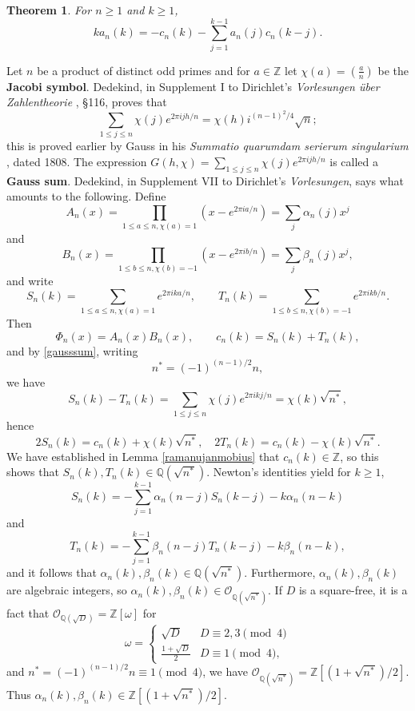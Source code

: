 \documentclass{article}
\newtheorem{theorem}{Theorem}
\theoremstyle{definition}
\begin{document}
\begin{theorem}
For $n \geq 1$ and $k \geq 1$,
\[
ka_n(k) = -c_n(k) - \sum_{j=1}^{k-1} a_n(j) c_n(k-j).
\]
\end{theorem}





Let $n$ be a product of distinct odd primes and for $a \in \mathbb{Z}$ let $\chi(a) = \left( \frac{a}{n}\right)$ be the \textbf{Jacobi symbol}. 
Dedekind, in Supplement I to Dirichlet's {\em Vorlesungen \"uber Zahlentheorie}  \cite[pp.~208--210]{dirichlet}, \S 116, proves that
\begin{equation}
\sum_{1 \leq j \leq n} \chi(j) e^{2\pi ij h/n} = \chi(h) i^{(n-1)^2/4} \sqrt{n};
\label{gausssum}
\end{equation}
this is proved earlier by 
Gauss in his {\em Summatio quarumdam serierum singularium} \cite[pp.~9--45]{gaussII}, dated 1808.
The expression $G(h,\chi)=\sum_{1 \leq j \leq n} \chi(j) e^{2\pi ij h/n}$ is called a \textbf{Gauss sum}.
Dedekind, in Supplement VII to Dirichlet's {\em Vorlesungen}, says what amounts to
the following.
Define
\[
A_n(x) = \prod_{1 \leq a \leq n, \chi(a)=1} (x-e^{2\pi ia/n}) = \sum_j \alpha_n(j) x^j
\] 
and
\[
B_n(x) = \prod_{1 \leq b \leq n, \chi(b)=-1} (x-e^{2\pi ib/n}) = \sum_j \beta_n(j) x^j,
\]
and write
\[
S_n(k) =  \sum_{1 \leq a \leq n, \chi(a)=1} e^{2\pi ik a/n},
\qquad T_n(k) = \sum_{1 \leq b \leq n, \chi(b)=-1} e^{2\pi ik b/n}.
\]
Then
\[
\Phi_n(x) = A_n(x) B_n(x),\qquad c_n(k) = S_n(k) + T_n(k),
\]
and by \eqref{gausssum}, writing
\[
n^*=(-1)^{(n-1)/2} n,
\]
we have
\[
S_n(k) - T_n(k) =\sum_{1 \leq j \leq n} \chi(j) e^{2\pi ik j/n} = \chi(k)  \sqrt{n^*},
\]
hence
\[
2S_n(k) = c_n(k) +  \chi(k)   \sqrt{n^*},
\quad
2T_n(k) = c_n(k) -  \chi(k)  \sqrt{n^*}.
\]
We have  established in Lemma \ref{ramanujanmobius} that $c_n(k) \in \mathbb{Z}$, so this shows that
$S_n(k), T_n(k) \in \mathbb{Q}(\sqrt{n^*})$.
Newton's identities yield for $k \geq 1$,
\[
S_n(k) = -\sum_{j=1}^{k-1}  \alpha_n(n-j) S_n(k-j) - k\alpha_n(n-k)
\]
and
\[
T_n(k) = -\sum_{j=1}^{k-1}  \beta_n(n-j) T_n(k-j) - k\beta_n(n-k),
\]
and it follows that $\alpha_n(k),\beta_n(k) \in \mathbb{Q}( \sqrt{n^*})$.
Furthermore, $\alpha_n(k),\beta_n(k)$ are algebraic integers, so
$\alpha_n(k),\beta_n(k) \in \mathcal{O}_{\mathbb{Q}(\sqrt{n^*})}$. 
If $D$ is a square-free, it is a fact \cite[p.~698, \S 15.3]{dummit} that 
$\mathcal{O}_{\mathbb{Q}(\sqrt{D})} = \mathbb{Z}[\omega]$ for 
\[
\omega = \begin{cases}
\sqrt{D}&D \equiv 2,3 \pmod{4}\\
\frac{1+\sqrt{D}}{2}&D \equiv 1 \pmod{4},
\end{cases}
\]
and $n^*=(-1)^{(n-1)/2} n \equiv 1 \pmod{4}$, we have
$\mathcal{O}_{\mathbb{Q}(\sqrt{n^*})} = \mathbb{Z}[(1+\sqrt{n^*})/2]$. Thus
$\alpha_n(k),\beta_n(k) \in  \mathbb{Z}[(1+\sqrt{n^*})/2]$. 
\end{document}
